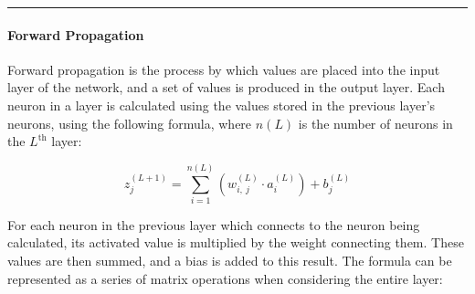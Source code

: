\documentclass{article}
\begin{document}
\vspace{1em}

\begin{center}
\rule{0.5\linewidth}{0.4pt}
\end{center}
\paragraph{Forward Propagation\\}
Forward propagation is the process by which values are placed into the input layer of the network, and a set of values is produced in the output layer. Each neuron in a layer is calculated using the values stored in the previous layer's neurons, using the following formula, where \(n(L)\) is the number of neurons in the \(L^\text{th}\) layer:

\begin{equation*}
    z_j^{(L+1)}=\sum_{i=1}^{n(L)}{\left(w_{i,\ j}^{(L)}\cdot a_{i}^{(L)}\right)}+b_{j}^{(L)}
\end{equation*}

For each neuron in the previous layer which connects to the neuron being calculated, its activated value is multiplied by the weight connecting them. These values are then summed, and a bias is added to this result. The formula can be represented as a series of matrix operations when considering the entire layer: \\
\end{document}
